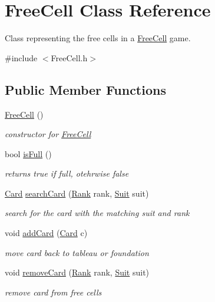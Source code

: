 \hypertarget{class_free_cell}{}\section{Free\+Cell Class Reference}
\label{class_free_cell}


Class representing the free cells in a \hyperlink{class_free_cell}{Free\+Cell} game.  




{\ttfamily \#include $<$Free\+Cell.\+h$>$}

\subsection*{Public Member Functions}
\begin{DoxyCompactItemize}
\item 
\hyperlink{class_free_cell_a4bba4f4932ee5ae1043aef8485116798}{Free\+Cell} ()\hypertarget{class_free_cell_a4bba4f4932ee5ae1043aef8485116798}{}\label{class_free_cell_a4bba4f4932ee5ae1043aef8485116798}

\begin{DoxyCompactList}\small\item\em constructor for \hyperlink{class_free_cell}{Free\+Cell} \end{DoxyCompactList}\item 
bool \hyperlink{class_free_cell_a96ff5f730b35c963e80a960352914147}{is\+Full} ()
\begin{DoxyCompactList}\small\item\em returns true if full, otehrwise false \end{DoxyCompactList}\item 
\hyperlink{class_card}{Card} \hyperlink{class_free_cell_af341fc1f3bdfc9edb7337879f12f45e6}{search\+Card} (\hyperlink{_card_a_d_t_8h_adf74d53cd68bbef55ba510b266ecbbed}{Rank} rank, \hyperlink{_card_a_d_t_8h_af78e1c8ea5e6837b6ab9452a1e435e4e}{Suit} suit)
\begin{DoxyCompactList}\small\item\em search for the card with the matching suit and rank \end{DoxyCompactList}\item 
void \hyperlink{class_free_cell_a31d2d73e75d6ca47531ab861e433ad03}{add\+Card} (\hyperlink{class_card}{Card} c)
\begin{DoxyCompactList}\small\item\em move card back to tableau or foundation \end{DoxyCompactList}\item 
void \hyperlink{class_free_cell_a8d41f669bf01f5c862121a4ff7d70ed8}{remove\+Card} (\hyperlink{_card_a_d_t_8h_adf74d53cd68bbef55ba510b266ecbbed}{Rank} rank, \hyperlink{_card_a_d_t_8h_af78e1c8ea5e6837b6ab9452a1e435e4e}{Suit} suit)
\begin{DoxyCompactList}\small\item\em remove card from free cells \end{DoxyCompactList}\end{DoxyCompactItemize}


